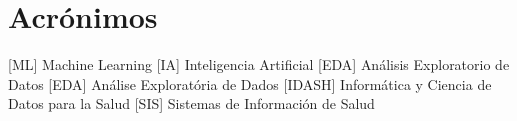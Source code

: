 \section*{Acrónimos}
\begin{acronym} 
 [ML] {Machine Learning}
 [IA] {Inteligencia Artificial}
 [EDA] {Análisis Exploratorio de Datos}
 [EDA] {Análise Exploratória de Dados}
 [IDASH] {Informática y Ciencia de Datos para la Salud}
 [SIS] {Sistemas de Información de Salud}
\end{acronym}
